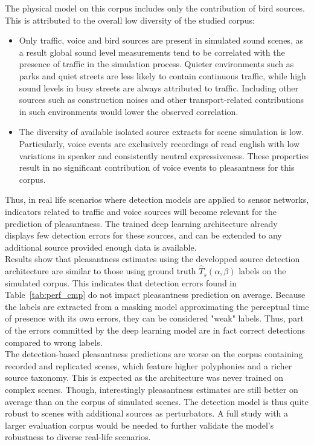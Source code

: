 \documentclass[11pt,a4paper]{article}
\begin{document}
The physical model on this corpus includes only the contribution of bird sources. This is attributed to the overall low diversity of the studied corpus:
\begin{itemize}
\item Only traffic, voice and bird sources are present in simulated sound scenes, as a result global sound level measurements tend to be correlated with the presence of traffic in the simulation process. Quieter environments such as parks and quiet streets are less likely to contain continuous traffic, while high sound levels in busy streets are always attributed to traffic. Including other sources such as construction noises and other transport-related contributions in such environments would lower the observed correlation.
\item The diversity of available isolated source extracts for scene simulation is low. Particularly, voice events are exclusively recordings of read english with low variations in speaker and consistently neutral expressiveness. These properties result in no significant contribution of voice events to pleasantness for this corpus.
\end{itemize}
Thus, in real life scenarios where detection models are applied to sensor networks, indicators related to traffic and voice sources will become relevant for the prediction of pleasantness. The trained deep learning architecture already displays few detection errors for these sources, and can be extended to any additional source provided enough data is available.\\

Results show that pleasantness estimates using the developped source detection architecture are similar to those using ground truth $\hat T_s(\alpha, \beta)$ labels on the simulated corpus. This indicates that detection errors found in Table~\ref{tab:perf_cmp} do not impact pleasantness prediction on average. Because the labels are extracted from a masking model approximating the perceptual time of presence with its own errors, they can be considered "weak" labels. Thus, part of the errors committed by the deep learning model are in fact correct detections compared to wrong labels.\\

The detection-based pleasantness predictions are worse on the corpus containing recorded and replicated scenes, which feature higher polyphonies and a richer source taxonomy. This is expected as the architecture was never trained on complex scenes. Though, interestingly pleasantness estimates are still better on average than on the corpus of simulated scenes. The detection model is thus quite robust to scenes with additional sources as perturbators. A full study with a larger evaluation corpus would be needed to further validate the model's robustness to diverse real-life scenarios.
\end{document}
